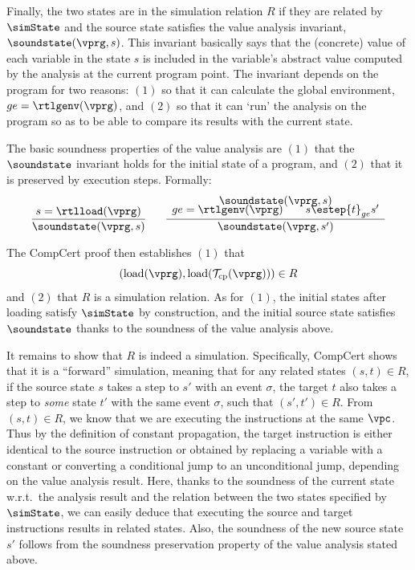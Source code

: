 Finally, the two states are in the simulation relation $R$
if they are related by $\simState$ and 
the source state satisfies the value analysis invariant, $\soundstate(\vprg,s)$.
This invariant basically says that the (concrete) value of each variable in the state $s$ is included in the variable's abstract value computed by the analysis at the current program point.
The invariant depends on the program for two reasons:
$(1)$ so that it can calculate the global environment, $ge=\rtlgenv(\vprg)$, and
$(2)$ so that it can `run' the analysis on the program so as to be able to compare its results with the current state.


The basic soundness properties of the value analysis are
$(1)$ that the $\soundstate$ invariant holds for the initial state of a program, and
$(2)$ that it is preserved by execution steps.
Formally:
\[
\frac{s = \rtlload(\vprg)}{
  \soundstate(\vprg,s)
}
\quad~~
\frac{ 
\begin{array}{c}
  \soundstate(\vprg,s) \\[-4pt]
  ge = \rtlgenv(\vprg)  \qquad
  s \estep{t}_{ge} s' 
\end{array}
}{
  \soundstate(\vprg,s')
}
\]

The CompCert proof then establishes $(1)$ that
\[(\mathrm{load}(\vprg),\mathrm{load}(\mathcal{T}_\mathrm{cp}(\vprg)))\in
R\] and $(2)$ that $R$ is a simulation relation. As for $(1)$, the
initial states after loading satisfy $\simState$ by construction, and
the initial source state satisfies $\soundstate$ thanks to the
soundness of the value analysis above.

It remains to show that $R$ is indeed a simulation.  Specifically,
CompCert shows that it is a ``forward'' simulation, meaning that for
any related states $(s,t)\in R$, if the source state $s$ takes a step
to $s'$ with an event $\sigma$, the target $t$ also takes a step to
\emph{some} state $t'$ with the same event $\sigma$, such that $(s',t')
\in R$.  From $(s,t)\in R$, we know that we are executing the
instructions at the same $\vpc$. Thus by the definition of constant
propagation, the target instruction is either identical to the source
instruction or obtained by replacing a variable with a constant or
converting a conditional jump to an unconditional jump, depending on
the value analysis result.  Here, thanks to the soundness of the
current state w.r.t.\ the analysis result and the relation between the
two states specified by $\simState$, we can easily deduce that
executing the source and target instructions results in related
states.  Also, the soundness of the new source state $s'$ follows
from the soundness preservation property of the value analysis stated
above.

